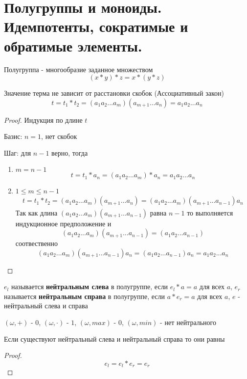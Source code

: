 \documentclass[../main/document.tex]{subfiles}
\begin{document}
\section{Полугруппы и моноиды. Идемпотенты, сократимые и обратимые элементы.}
\begin{dfn}[Полугруппа]
Полугруппа - многообразие заданное множеством
$$(x*y)*z=x*(y*z)$$
\end{dfn}
\begin{exm}
\end{exm}
\begin{thm}
Значение терма не зависит от расстановки скобок (Ассоциативный закон)
$$t=t_1*t_2=(a_{1}a_{2}...a_{m})(a_{m+1}...a_n)=a_{1}a_{2}...a_{n}$$
\begin{proof}
Индукция по длине $t$

Базис: $n=1$, нет скобок

Шаг: для $n-1$ верно, тогда
\begin{enumerate}
\item $m=n-1$
$$t=t_1*a_n=(a_{1}a_{2}...a_{m})*a_n=a_{1}a_{2}...a_{n}$$
\item $1\leq m\leq n-1$
\begin{multline*}
t=t_1*t_2=(a_{1}a_{2}...a_{m})(a_{m+1}...a_n)=(a_{1}a_{2}...a_{m})(a_{m+1}...a_{n-1})a_n
\end{multline*}
Так как длина $(a_{1}a_{2}...a_{m})(a_{m+1}...a_{n-1})$ равна $n-1$ то выполняется индукционное предположение и
$$(a_{1}a_{2}...a_{m})(a_{m+1}...a_{n-1})=(a_{1}a_{2}...a_{n-1})$$
соотвественно
$$(a_{1}a_{2}...a_{m})(a_{m+1}...a_{n-1})a_n=
(a_{1}a_{2}...a_{n-1})a_n=a_{1}a_{2}...a_{n}$$
\end{enumerate}
\end{proof}
\end{thm}
\begin{dfn}
$e_l$ называется \textbf{нейтральным слева} в полугруппе, если $e_l*a=a$ для всех $a$,
$e_r$ называется \textbf{нейтральным справа} в полугруппе, если $a*e_r=a$ для всех $a$,
$e$ - нейтральный слева и справа
\end{dfn}
\begin{exm}

$(\omega,+)$ - $0$, $(\omega,\cdot)$ - $1$, $(\omega,max)$ - $0$, $(\omega,min)$ - нет нейтрального
\end{exm}
\begin{thm}
Если существуют нейтральный слева и нейтральный справа то они равны
\begin{proof}
$$e_l=e_l*e_r=e_r$$
\end{proof}
\end{thm}
\end{document}
